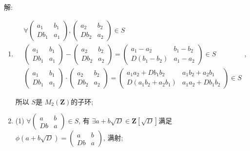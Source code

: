 \documentclass[a4paper,12pt]{ctexart}
\newcommand{\Z}{\mathbf{Z}}
\begin{document}
    解: \begin{enumerate}
      \item 
      $\begin{aligned}
        &\forall \left(\begin{array}{ll}
        a_{1} & b_{1} \\
        D b_{1} & a_{1}
        \end{array}\right),\left(\begin{array}{ll}
        a_{2} & b_{2} \\
        D b_{2} & a_{2}
        \end{array}\right) \in S \\
        &\left(\begin{array}{ll}
        a_{1} & b_{1} \\
        D b_{1} & a_{1}
        \end{array}\right)-\left(\begin{array}{ll}
        a_{2} & b_{2} \\
        D b_{2} & a_{2}
        \end{array}\right)=\left(\begin{array}{ll}
        a_{1}-a_{2} & b_{1}-b_{2} \\
        D\left(b_{1}-b_{2}\right) & a_{1}-a_{2}
        \end{array}\right) \in S \\
        &\left(\begin{array}{ll}
        a_{1} & b_{1} \\
        D b_{1} & a_{1}
        \end{array}\right) \cdot\left(\begin{array}{ll}
        a_{2} & b_{2} \\
        D b_{2} & a_{2}
        \end{array}\right)=\left(\begin{array}{ll}
        a_{1} a_{2}+D b_{1} b_{2} & a_{1} b_{2}+a_{2} b_{1} \\
        D\left(a_{1} b_{2}+a_{2} b_{1}\right) & a_{1} a_{2}+D b_{1} b_{2}
        \end{array}\right) \in S
        \end{aligned}$,
        
        所以 $ S $是 $ M_2(\Z) $的子环;
        \item  (1) $ \forall \begin{pmatrix}a&b\\Db&a\end{pmatrix}\in S $, 有 $\exists a+b\sqrt{D}\in\Z[\sqrt{D}] $满足 $ \phi(a+b\sqrt{D})=\begin{pmatrix}a&b\\Db&a\end{pmatrix} $, 满射;
        

\end{enumerate}
\end{document}
